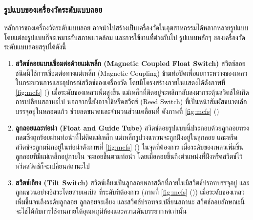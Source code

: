 \documentclass[final,11pt,a4paper]{article}
\begin{document}
\subsubsection{รูปแบบของเครื่องวัดระดับแบบลอย}
หลักการของเครื่องวัดระดับแบบลอย อาจนำไปสร้างเป็นเครื่องวัดในอุตสาหกรรมได้หลากหลายรูปแบบ โดยแต่ละรูปแบบก็จะเหมาะกับสภาพแวดล้อม 
และการใช้งานที่ต่างกันไป รูปแบบหลักๆ ของเครื่องวัดระดับแบบลอยสรุปได้ดังนี้
\begin{enumerate}
    \item \textbf{สวิตช์ลอยแบบเชื่อมต่อด้วยแม่เหล็ก (Magnetic Coupled Float Switch)} สวิตช์ลอยชนิดนี้ใช้การเชื่อมต่อทางแม่เหล็ก (Magnetic Coupling)
    ข้ามท่อปิดเพื่อแยกระหว่างของเหลวในกระบวนการและอุปกรณ์สวิตช์ของเครื่องวัด โดยมีโครงสร้างภายในแสดงได้ดังภาพที่  \ref{fig:mcfs} ()
    เมื่อระดับของเหลวเพิ่มสูงขึ้น  แม่เหล็กที่ติดอยู่จะพลิกกลับลงมากระตุ้นสวิตช์ให้เกิดการเปลี่ยนสถานะไป นอกจากนี้ยังอาจใช้หรีดสวิตช์ (Reed Switch) ที่เป็นหน้าสัมผัสขนาดเล็กบรรจุอยู่ในหลอดแก้ว 
    ช่วยลดขนาดและจำนวนส่วนเคลื่อนที่ ดังภาพที่ \ref{fig:mcfs} ()
    \item \textbf{ลูกลอยและท่อนำ (Float and Guide Tube)} สวิตช์ลอยรูปแบบนี้ประกอบด้วยลูกลอยทรงกลมซึ่งถูกร้อยผ่านท่อนำที่ไม่ติดแม่เหล็ก
    แม่เหล็กรูปวงแหวนจะถูกฝังอยู่ในลูกลอย และหรีดสวิตช์จะถูกผนึกอยู่ในท่อนำดังภาพที่ \ref{fig:mcfs} () ในจุดที่ต้องการ เมื่อระดับของเหลวเพิ่มขึ้น ลูกลอยที่มีแม่เหล็กอยู่ภายใน
    จะลอยขึ้นตามท่อนำ โดยเมื่อลอยขึ้นถึงตำแหน่งที่ฝังหรีดสวิตช์ไว้ หรีดสวิตช์ก็จะเปลี่ยนสถานะไป
    \item \textbf{สวิตช์เอียง (Tilt Switch)} สวิตช์เอียงเป็นลูกลอยพลาสติกที่ภายในมีสวิตช์ปรอทบรรจุอยู่ และถูกแขวนอย่างอิสระโดยสายเคเบิล 
    ที่ระดับที่ต้องการ (ภาพที่ \ref{fig:mcfs} ()) เมื่อระดับของเหลวเพิ่มขึ้นจนถึงระดับลูกลอย ลูกลอยจะเอียง และสวิตช์ปรอทจะเปลี่ยนสถานะ 
    สวิตช์ลอยลักษณะนี้จะใช้ได้กับการใช้งานภายใต้อุณหภูมิห้องและความดันบรรยากาศเท่านั้น
\end{enumerate}
\end{document}
